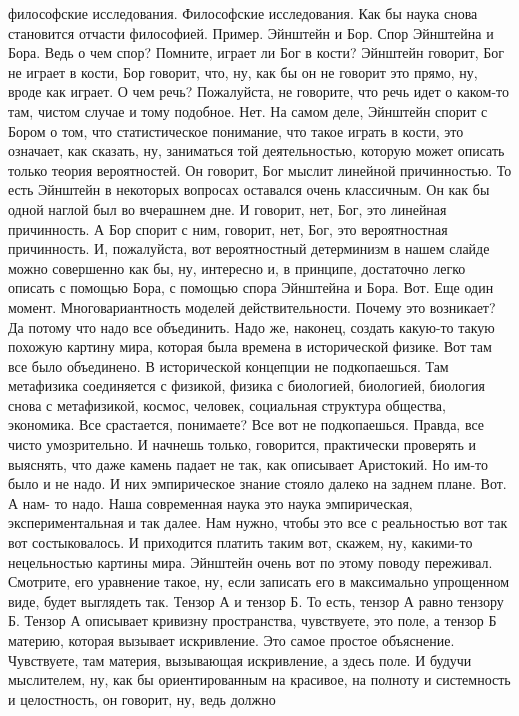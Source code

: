 философские исследования. Философские исследования. Как бы наука снова
становится отчасти философией. Пример. Эйнштейн и Бор. Спор Эйнштейна и Бора.
Ведь о чем спор? Помните, играет ли Бог в кости? Эйнштейн говорит, Бог не играет
в кости, Бор говорит, что, ну, как бы он не говорит это прямо, ну, вроде как
играет. О чем речь? Пожалуйста, не говорите, что речь идет о каком-то там,
чистом случае и тому подобное. Нет. На самом деле, Эйнштейн спорит с Бором о
том, что статистическое понимание, что такое играть в кости, это означает, как
сказать, ну, заниматься той деятельностью, которую может описать только теория
вероятностей. Он говорит, Бог мыслит линейной причинностью. То есть Эйнштейн в
некоторых вопросах оставался очень классичным. Он как бы одной наглой был во
вчерашнем дне. И говорит, нет, Бог, это линейная причинность. А Бор спорит с
ним, говорит, нет, Бог, это вероятностная причинность. И, пожалуйста, вот
вероятностный детерминизм в нашем слайде можно совершенно как бы, ну, интересно
и, в принципе, достаточно легко описать с помощью Бора, с помощью спора
Эйнштейна и Бора. Вот. Еще один момент. Многовариантность моделей
действительности. Почему это возникает? Да потому что надо все объединить. Надо
же, наконец, создать какую-то такую похожую картину мира, которая была времена в
исторической физике. Вот там все было объединено. В исторической концепции не
подкопаешься. Там метафизика соединяется с физикой, физика с биологией,
биологией, биология снова с метафизикой, космос, человек, социальная структура
общества, экономика. Все срастается, понимаете? Все вот не подкопаешься. Правда,
все чисто умозрительно. И начнешь только, говорится, практически проверять и
выяснять, что даже камень падает не так, как описывает Аристокий. Но им-то было
и не надо. И них эмпирическое знание стояло далеко на заднем плане. Вот. А нам-
то надо. Наша современная наука это наука эмпирическая, экспериментальная и так
далее. Нам нужно, чтобы это все с реальностью вот так вот состыковалось. И
приходится платить таким вот, скажем, ну, какими-то нецельностью картины мира.
Эйнштейн очень вот по этому поводу переживал. Смотрите, его уравнение такое, ну,
если записать его в максимально упрощенном виде, будет выглядеть так. Тензор А и
тензор Б. То есть, тензор А равно тензору Б. Тензор А описывает кривизну
пространства, чувствуете, это поле, а тензор Б материю, которая вызывает
искривление. Это самое простое объяснение. Чувствуете, там материя, вызывающая
искривление, а здесь поле. И будучи мыслителем, ну, как бы ориентированным на
красивое, на полноту и системность и целостность, он говорит, ну, ведь должно
